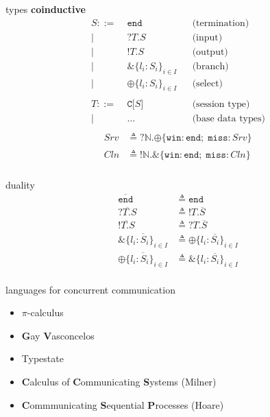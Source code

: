 \documentclass[dvipsnames]{beamer}
\newcommand{\sitem}{\item[\raisebox{.45ex}{\rule{.6ex}{.6ex}}]}
\newcommand{\picalc}{$\pi$-calculus}
\newcommand{\type}[1]{\mathtt{#1}}
\newcommand{\tend}[0]{\type{end}}
\newcommand{\trecv}[1]{\type{?} #1 \type{.}}
\newcommand{\tsend}[1]{\type{!} #1 \type{.}}
\newcommand{\tbranch}[2]{\type{\&} \{ #1 \}_{#2}}
\newcommand{\tselect}[2]{\type{\oplus} \{ #1 \}_{#2}}
\newcommand{\tchan}[1]{\type{C[} #1 \type{]}}
\newcommand{\dual}[1]{\overline{#1}}
\newcommand{\is}[0]{\triangleq}
\begin{document}
  \begin{frame}{types}
    \textbf{coinductive}
    \setlength{\abovedisplayskip}{0pt}
    \setlength{\belowdisplayskip}{0pt}
    \setlength{\abovedisplayshortskip}{0pt}
    \setlength{\belowdisplayshortskip}{0pt}
    \begin{align*}
      S ::=& \; \tend      &&\text{(termination)}    \\ 
      |& \; \trecv{T}S     &&\text{(input)}       \\ 
      |& \; \tsend{T}S     &&\text{(output)}       \\           
      |& \; \tbranch{l_i : S_i}{i \in I} &&\text{(branch)}       \\ 
      |& \; \tselect{l_i : S_i}{i \in I} &&\text{(select)}       \\           
      \\
      T ::=& \; \tchan{S} &&\text{(session type)} \\
      | & \; \ldots       &&\text{(base data types)} \\
    \end{align*}
    \begin{align*}
      Srv & \is \trecv{\mathtt{\mathbb{N}}} \tselect{\mathtt{win} : \tend ; \; \mathtt{miss} : Srv}{} \\
      Cln & \is \tsend{\mathtt{\mathbb{N}}} \tbranch{\mathtt{win} : \tend ; \; \mathtt{miss} : Cln}{} \\
    \end{align*}
  \end{frame}

  \begin{frame}{duality}
    \begin{equation*}
      \begin{aligned}
        \dual{\tend}          &\is \tend\\
        \dual{\trecv{T}S}     &\is \tsend{T}\dual{S}\\
        \dual{\tsend{T}S}     &\is \trecv{T}\dual{S}\\
        \dual{\tbranch{l_i : S_i}{i \in I}} &\is \tselect{l_i : \dual{S_i}}{i \in I}\\
        \dual{\tselect{l_i : S_i}{i \in I}} &\is \tbranch{l_i : \dual{S_i}}{i \in I}\\
      \end{aligned}
    \end{equation*}
  \end{frame}

  \begin{frame}{languages for concurrent communication}
    \begin{itemize}
      \setlength\itemsep{1em}
      \sitem \picalc{}
      \sitem \textbf{G}ay \textbf{V}asconcelos
      \sitem Typestate
      \sitem \textbf{C}alculus of \textbf{C}ommunicating \textbf{S}ystems (Milner)
      \sitem \textbf{C}ommmunicating \textbf{S}equential \textbf{P}rocesses (Hoare)
    \end{itemize}
  \end{frame}
  
\end{document}
